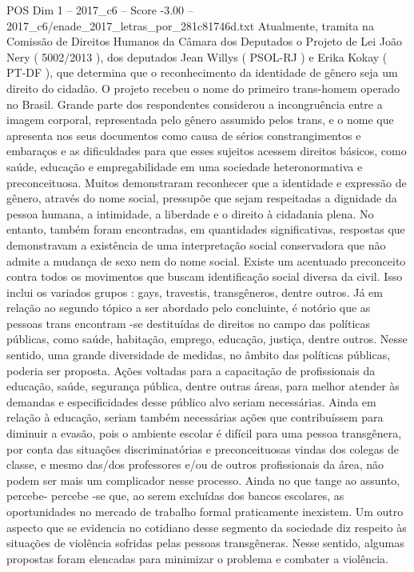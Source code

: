 \begin{textsample}{POS Dim 1 – 2017\_c6 – Score -3.00 – 2017\_c6/enade\_2017\_letras\_por\_281c81746d.txt}
Atualmente, tramita na Comissão de Direitos Humanos da Câmara dos Deputados o Projeto de Lei João Nery ( 5002/2013 ), dos deputados Jean Willys ( PSOL-RJ ) e Erika Kokay ( PT-DF ), que determina que o reconhecimento da identidade de gênero seja um direito do cidadão.
O projeto recebeu o nome do primeiro trans-homem operado no Brasil.
Grande parte dos respondentes considerou a incongruência entre a imagem corporal, representada pelo gênero assumido pelos trans, e o nome que apresenta nos seus documentos como causa de sérios constrangimentos e embaraços e as dificuldades para que esses sujeitos acessem direitos básicos, como saúde, educação e empregabilidade em uma sociedade heteronormativa e preconceituosa.
Muitos demonstraram reconhecer que a identidade e expressão de gênero, através do nome social, pressupõe que sejam respeitadas a dignidade da pessoa humana, a intimidade, a liberdade e o direito à cidadania plena.
No entanto, também foram encontradas, em quantidades significativas, respostas que demonstravam a existência de uma interpretação social conservadora que não admite a mudança de sexo nem do nome social.
Existe um acentuado preconceito contra todos os movimentos que buscam identificação social diversa da civil.
Isso inclui os variados grupos : gays, travestis, transgêneros, dentre outros.
Já em relação ao segundo tópico a ser abordado pelo concluinte, é notório que as pessoas trans encontram -se destituídas de direitos no campo das políticas públicas, como saúde, habitação, emprego, educação, justiça, dentre outros.
Nesse sentido, uma grande diversidade de medidas, no âmbito das políticas públicas, poderia ser proposta.
Ações voltadas para a capacitação de profissionais da educação, saúde, segurança pública, dentre outras áreas, para melhor atender às demandas e especificidades desse público alvo seriam necessárias.
Ainda em relação à educação, seriam também necessárias ações que contribuíssem para diminuir a evasão, pois o ambiente escolar é difícil para uma pessoa transgênera, por conta das situações discriminatórias e preconceituosas vindas dos colegas de classe, e mesmo das/dos professores e/ou de outros profissionais da área, não podem ser mais um complicador nesse processo.
Ainda no que tange ao assunto, percebe- percebe -se que, ao serem excluídas dos bancos escolares, as oportunidades no mercado de trabalho formal praticamente inexistem.
Um outro aspecto que se evidencia no cotidiano desse segmento da sociedade diz respeito às situações de violência sofridas pelas pessoas transgêneras.
Nesse sentido, algumas propostas foram elencadas para minimizar o problema e combater a violência.

\end{textsample}
